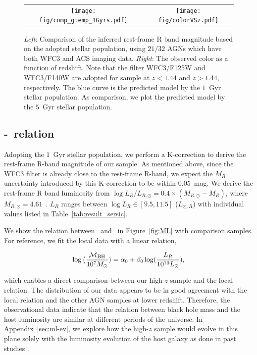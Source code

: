 \documentclass[apj]{emulateapj}
\begin{document}
\begin{figure}
\centering
\begin{tabular}{c c}
{\texttt{[image: fig/comp\_gtemp\_1Gyrs.pdf]}}&
{\texttt{[image: fig/colorVSz.pdf]}}\\
\end{tabular}
\caption{\label{fig:compare_temp} 
 {\it Left}: Comparison of the inferred rest-frame R band magnitude based on the adopted stellar population, using $21/32$ AGNs which have both WFC3 and ACS imaging data.  {\it Right}: The observed color as a function of redshift. Note that the filter WFC3/F125W and WFC3/F140W are adopted for sample at $z<1.44$ and $z>1.44$, respectively. The blue curve is the predicted model by the $1$~Gyr stellar population. As comparison, we plot the predicted model by the $5$~Gyr stellar population.
}
\end{figure} 


 
\subsection{\mbh-\lhost\ relation}\label{sec:ml}

Adopting the $1$~Gyr stellar population, we perform a K-correction to derive the rest-frame R-band magnitude of our sample. As mentioned above, since the WFC3 filter is already close to the rest-frame R-band, we expect the $M_R$ uncertainty introduced by this K-correction to be within $0.05$~mag. We derive the rest-frame R band luminosity from $\log L_R/L_{R, \odot} = 0.4\times(M_{R, \odot}-M_R)$, where $M_{R, \odot}=4.61$~\citep{Blanton07}. $L_R$ ranges between $\log L_R \in [9.5, 11.5]$ ($L_{\odot,R}$) with individual values listed in Table~\ref{tab:result_sersic}. 

We show the relation between \mbh\ and \lhost\ in Figure~\ref{fig:ML} with comparison samples. For reference, we fit the local data with a linear relation,

\begin{eqnarray}
\label{eq:MLlocal}
\log \big( \frac{\mathcal M_{\rm BH}}{10^{7}M_{\odot}})= \alpha_0 + \beta_0 \log(\frac{L_R}{10^{10}L_{\odot}}),
\end {eqnarray}

\noindent which enables a direct comparison between our high-$z$ sample and the local relation. The distribution of our data appears to be in good agreement with the local relation and the other AGN samples at lower redshift. Therefore, the observational data indicate that the relation between black hole mass and the host luminosity are similar at different periods of the universe. In Appendix~\ref{sec:ml-ev}, we explore how the high-$z$  sample would evolve in this plane solely with the luminosity evolution of the host galaxy as done in past studies \citep[e.g., ][]{Ding2017b}. 
\end{document}
